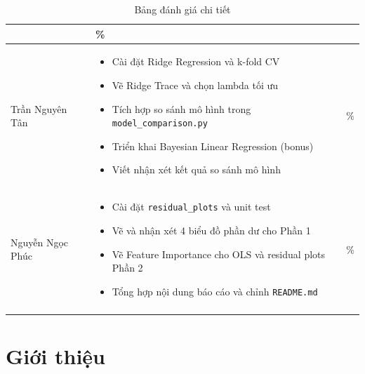 \documentclass[a4paper]{article}
\begin{document}
\begin{longtable}{|>{\raggedright\arraybackslash}p{}|>{\raggedright\arraybackslash}p{}|>{\centering\arraybackslash}p{}|}
\begin{itemize}[leftmargin=*, noitemsep, topsep=0pt, partopsep=0pt]
                    \end{itemize} & 100\% \\ \hline
Trần Nguyên Tân   & \begin{itemize}[leftmargin=*, noitemsep, topsep=0pt, partopsep=0pt]
                        \item Cài đặt Ridge Regression và k-fold CV
                        \item Vẽ Ridge Trace và chọn lambda tối ưu
                        \item Tích hợp so sánh mô hình trong \texttt{model\_comparison.py}
                        \item Triển khai Bayesian Linear Regression (bonus)
                        \item Viết nhận xét kết quả so sánh mô hình
                    \end{itemize} & 100\% \\ \hline
Nguyễn Ngọc Phúc     & \begin{itemize}[leftmargin=*, noitemsep, topsep=0pt, partopsep=0pt]
                        \item Cài đặt \texttt{residual\_plots} và unit test
                        \item Vẽ và nhận xét 4 biểu đồ phần dư cho Phần 1
                        \item Vẽ Feature Importance cho OLS và residual plots Phần 2
                        \item Tổng hợp nội dung báo cáo và chỉnh \texttt{README.md}
                    \end{itemize} & 100\% \\ \hline
\caption{Bảng đánh giá chi tiết}\\
\end{longtable}
\endgroup

\FloatBarrier


\section{Giới thiệu}
\end{document}
